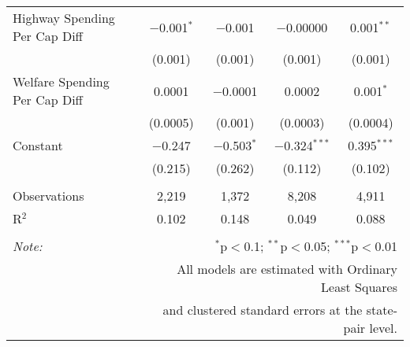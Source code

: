 \begin{table}[!htbp]
\begin{tabular}{@{\extracolsep{5pt}}lcccc}
  Highway Spending Per Cap Diff & $-$0.001$^{*}$ & $-$0.001 & $-$0.00000 & 0.001$^{**}$ \\ 
  & (0.001) & (0.001) & (0.001) & (0.001) \\ 
  Welfare Spending Per Cap Diff & 0.0001 & $-$0.0001 & 0.0002 & 0.001$^{*}$ \\ 
  & (0.0005) & (0.001) & (0.0003) & (0.0004) \\ 
  Constant & $-$0.247 & $-$0.503$^{*}$ & $-$0.324$^{***}$ & 0.395$^{***}$ \\ 
  & (0.215) & (0.262) & (0.112) & (0.102) \\ 
 \hline \\[-1.8ex] 
Observations & 2,219 & 1,372 & 8,208 & 4,911 \\ 
R$^{2}$ & 0.102 & 0.148 & 0.049 & 0.088 \\ 
\hline 
\hline \\[-1.8ex] 
\textit{Note:}  & \multicolumn{4}{r}{$^{*}$p$<$0.1; $^{**}$p$<$0.05; $^{***}$p$<$0.01} \\ 
 & \multicolumn{4}{r}{All models are estimated with Ordinary Least Squares} \\ 
 & \multicolumn{4}{r}{and clustered standard errors at the state-pair level.} \\ 
\end{tabular} 
\end{table} 
